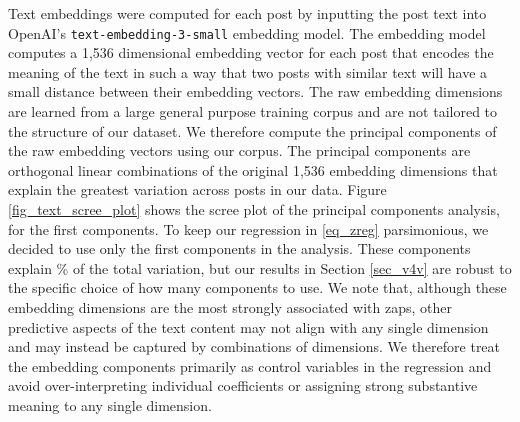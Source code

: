 Text embeddings were computed for each post by inputting the post text into \mbox{OpenAI's} \texttt{text-embedding-3-small} embedding model. The embedding model computes a 1,536 dimensional embedding vector for each post that encodes the meaning of the text in such a way that two posts with similar text will have a small distance between their embedding vectors. The raw embedding dimensions are learned from a large general purpose training corpus and are not tailored to the structure of our dataset. We therefore compute the principal components of the raw embedding vectors using our corpus. The principal components are orthogonal linear combinations of the original 1,536 embedding dimensions that explain the greatest variation across posts in our data. Figure \ref{fig_text_scree_plot} shows the scree plot of the principal components analysis, for the first  components. To keep our regression in \eqref{eq_zreg} parsimonious, we decided to use only the first  components in the analysis. These components explain  \% of the total variation,  but our results in Section \ref{sec_v4v} are robust to the specific choice of how many components to use.  We note that, although these embedding dimensions are the most strongly associated with zaps, other predictive aspects of the text content may not align with any single dimension and may instead be captured by combinations of dimensions. We therefore treat the embedding components primarily as control variables in the regression and avoid over-interpreting individual coefficients or assigning strong substantive meaning to any single dimension.

\pagebreak

